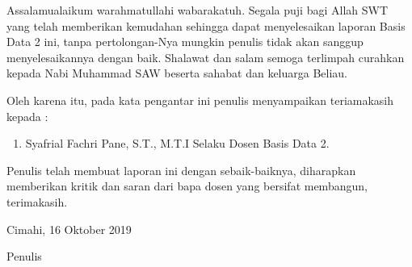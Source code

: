 \begin{acknowledgements}
Assalamualaikum warahmatullahi wabarakatuh. Segala puji bagi Allah SWT yang telah memberikan kemudahan sehingga dapat menyelesaikan laporan Basis Data 2 ini, tanpa pertolongan-Nya mungkin penulis tidak akan sanggup menyelesaikannya dengan baik. Shalawat dan salam semoga terlimpah curahkan kepada Nabi Muhammad SAW beserta sahabat dan keluarga Beliau.

Oleh karena itu, pada kata pengantar ini penulis menyampaikan teriamakasih kepada :
\begin{enumerate}

\item  Syafrial Fachri Pane, S.T., M.T.I Selaku Dosen Basis Data 2.
\end{enumerate}

Penulis telah membuat laporan ini dengan sebaik-baiknya, diharapkan memberikan kritik dan saran dari bapa dosen yang bersifat membangun, terimakasih.

\begin{raggedleft}

Cimahi, 16 Oktober 2019

Penulis

\end{raggedleft}

\end{acknowledgements}